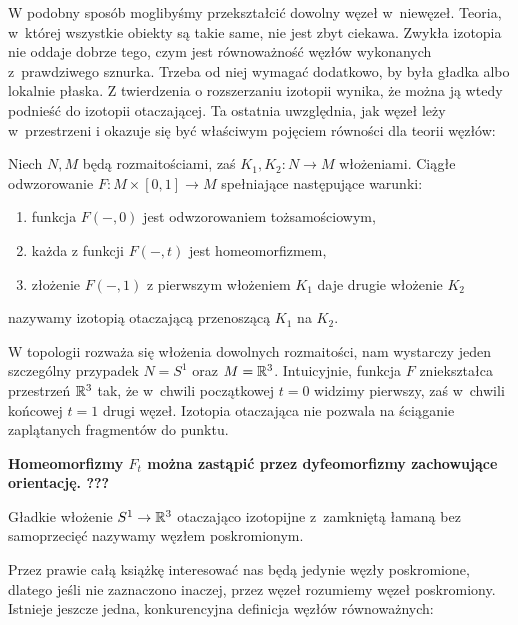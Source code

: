 W podobny sposób moglibyśmy przekształcić dowolny węzeł w~niewęzeł.
Teoria, w~której wszystkie obiekty są takie same, nie jest zbyt ciekawa.
Zwykła izotopia nie oddaje dobrze tego, czym jest równoważność węzłów wykonanych z~prawdziwego sznurka.
Trzeba od niej wymagać dodatkowo, by była gładka albo lokalnie płaska.
Z twierdzenia o rozszerzaniu izotopii wynika, że można ją wtedy podnieść do izotopii otaczającej.
Ta ostatnia uwzględnia, jak węzeł leży w~przestrzeni i okazuje się być właściwym pojęciem równości dla teorii węzłów:

\begin{definition} \label{def_ambient_isotopy}
    Niech $N, M$ będą rozmaitościami, zaś $K_1, K_2 \colon N \to M$ włożeniami.
    Ciągłe odwzorowanie $F \colon M \times [0,1] \to M$ spełniające następujące warunki:
    \begin{enumerate}
        \item funkcja $F(-, 0)$ jest odwzorowaniem tożsamościowym,
        \item każda z funkcji $F(-, t)$ jest homeomorfizmem,
        \item złożenie $F(-, 1)$ z pierwszym włożeniem $K_1$ daje drugie włożenie $K_2$
    \end{enumerate}
    nazywamy izotopią otaczającą przenoszącą $K_1$ na $K_2$.
\end{definition}

W topologii rozważa się włożenia dowolnych rozmaitości, nam wystarczy jeden szczególny przypadek $N = S^1$ oraz $M = \mathbb R^3$.
Intuicyjnie, funkcja $F$ zniekształca przestrzeń $\mathbb R^3$ tak, że w~chwili początkowej $t = 0$ widzimy pierwszy, zaś w~chwili końcowej $t = 1$ drugi węzeł.
Izotopia otaczająca nie pozwala na ściąganie zaplątanych fragmentów do punktu.

{\color{red}\textbf{Homeomorfizmy $F_t$ można zastąpić przez dyfeomorfizmy zachowujące orientację. ???}}

\begin{definition}[węzeł]
    \label{def:knot}
    Gładkie włożenie $S^1 \to \mathbb R^3$ otaczająco izotopijne z~zamkniętą łamaną bez samoprzecięć nazywamy węzłem poskromionym.
\end{definition}

Przez prawie całą książkę interesować nas będą jedynie węzły poskromione,
dlatego jeśli nie zaznaczono inaczej, przez węzeł rozumiemy węzeł poskromiony.
Istnieje jeszcze jedna, konkurencyjna definicja węzłów równoważnych:

